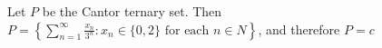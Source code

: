 Let $P$ be the Cantor ternary set. Then $P = \left\{ \sum_{n=1}^{\infty} \frac{x_n}{3^n} : x_n \in \{0, 2\} \text{ for each } n \in N \right\}$, and therefore $P = c$